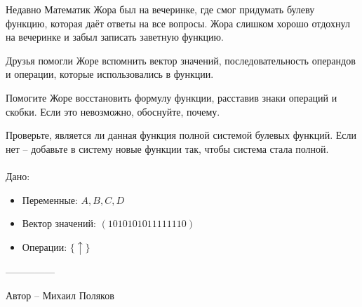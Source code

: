 \question
Недавно Математик Жора был на вечеринке, где смог придумать булеву функцию, которая даёт ответы на все вопросы. Жора слишком хорошо отдохнул на вечеринке и забыл записать заветную функцию.

Друзья помогли Жоре вспомнить вектор значений, последовательность операндов и операции, которые использовались в функции.

Помогите Жоре восстановить формулу функции, расставив знаки операций и скобки. Если это невозможно, обоснуйте, почему.

Проверьте, является ли данная функция полной системой булевых функций. Если нет -- добавьте в систему новые функции так, чтобы система стала полной.
\\
\\
Дано:
\begin{itemize}
\item Переменные: $A, B, C, D$
\item Вектор значений: $(1010101011111110)$
\item Операции: $\{\uparrow\}$
\end{itemize}

---------------

Автор -- Михаил Поляков
